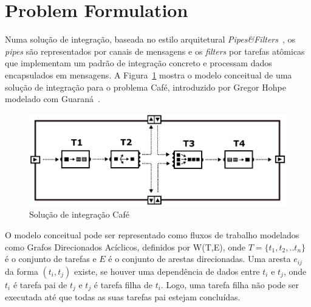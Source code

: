 \section{Problem Formulation}
\label{sec:formulacao_problema}
Numa solução de integração, baseada no estilo arquitetural \emph{Pipes\&Filters}~\cite{alexander1977}, os \textit{pipes} são representados por canais de mensagens e os \textit{filters} por tarefas atômicas que implementam um padrão de integração concreto e processam dados encapsulados em mensagens.
A Figura~\ref{fig:sample-cafe} mostra o modelo conceitual de uma solução de integração para o problema Café, introduzido por Gregor Hohpe~\cite{hohpe2005} modelado com Guaraná~\cite{frantz2016}.
\begin{figure}[htb]
	\centering
	\includegraphics[scale=0.25]{./figs/cafe-guarana.png}
	\caption{Solução de integração Café}
	\label{fig:sample-cafe}
\end{figure}
O modelo conceitual pode ser representado como fluxos de trabalho modelados como Grafos Direcionados Acíclicos, definidos por W(T,E), onde $T = \{t_1,t_2,..t_n\}$ é o conjunto de tarefas e $E$ é o conjunto de arestas direcionadas. Uma aresta $e_{ij}$ da forma $({t_i},{t_j})$ existe, se houver uma dependência de dados entre $t_i$ e $t_j$, onde $t_i$ é tarefa pai de $t_j$ e $t_j$ é tarefa filha de $t_i$. Logo, uma tarefa filha não pode ser executada até que todas as suas tarefas pai estejam concluídas. 

